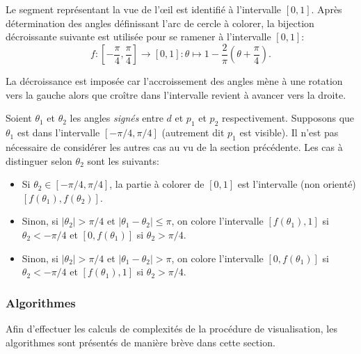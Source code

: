 Le segment représentant la vue de l'\oe{}il est identifié à l'intervalle
$[0, 1]$. Après détermination des angles définissant l'arc de cercle
à colorer, la bijection décroissante suivante est utilisée pour
se ramener à l'intervalle $[0, 1]$:
$$f:\left[-\frac{\pi}{4}, \frac{\pi}{4}\right]\to [0, 1]: \theta \mapsto 1 - \frac{2}{\pi}\left(\theta + \frac{\pi}{4}\right).$$

La décroissance est imposée car l'accroissement des angles mène
à une rotation vers la gauche alors que croître dans l'intervalle
revient à avancer vers la droite.

Soient $\theta_1$ et $\theta_2$ les angles \emph{signés}
entre $d$ et $p_1$ et $p_2$
respectivement. Supposons que $\theta_1$ est dans l'intervalle $[-\pi/4, \pi/4]$
(autrement dit $p_1$ est visible). Il n'est pas nécessaire de considérer
les autres cas au vu de la section précédente. Les cas à distinguer selon
$\theta_2$ sont les suivants:

\begin{itemize}
  \item Si $\theta_2\in[-\pi/4, \pi/4]$, la partie à colorer de $[0, 1]$ est
    l'intervalle (non orienté) $[f(\theta_1), f(\theta_2)]$.
  \item Sinon, si $|\theta_2|>\pi/4$ et $|\theta_1-\theta_2|\leq \pi$,
    on colore l'intervalle $[f(\theta_1), 1]$ si $\theta_2<-\pi/4$ et
    $[0, f(\theta_1)]$ si $\theta_2>\pi/4$.
  \item Sinon, si $|\theta_2|>\pi/4$ et $|\theta_1-\theta_2|> \pi$,
    on colore l'intervalle $[0, f(\theta_1)]$ si $\theta_2<-\pi/4$ et
    $[f(\theta_1), 1]$ si $\theta_2>\pi/4$.
\end{itemize}

\subsubsection{Algorithmes}

Afin d'effectuer les calculs de complexités de la procédure
de visualisation, les algorithmes sont présentés de manière
brève dans cette section.

